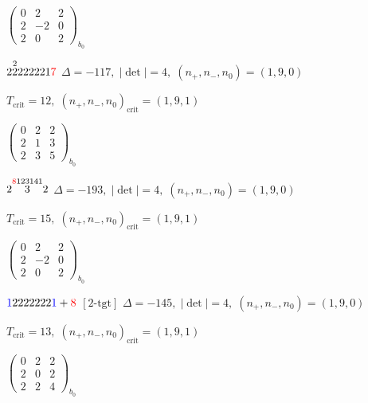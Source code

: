 \documentclass[10pt]{article}
\begin{document}
\hspace{2em}$\left(\begin{smallmatrix}0 & 2 & 2 \\ 2 & -2 & 0 \\ 2 & 0 & 2\end{smallmatrix}\right)_{\!b_0}$

\smallskip

$2\overset{2}{2}222221\textcolor{red}{7}$ \quad $\Delta=-117,\; |\det|=4,\; (n_+,n_-,n_0)=(1,9,0)$

\hspace{1em}$T_{\text{crit}}=12,\; (n_+,n_-,n_0)_{\text{crit}}=(1,9,1)$

\hspace{2em}$\left(\begin{smallmatrix}0 & 2 & 2 \\ 2 & 1 & 3 \\ 2 & 3 & 5\end{smallmatrix}\right)_{\!b_0}$

\smallskip

$2\overset{\textcolor{red}{8}123141}{3}2$ \quad $\Delta=-193,\; |\det|=4,\; (n_+,n_-,n_0)=(1,9,0)$

\hspace{1em}$T_{\text{crit}}=15,\; (n_+,n_-,n_0)_{\text{crit}}=(1,9,1)$

\hspace{2em}$\left(\begin{smallmatrix}0 & 2 & 2 \\ 2 & -2 & 0 \\ 2 & 0 & 2\end{smallmatrix}\right)_{\!b_0}$

\smallskip

$\textcolor{blue}{1}2222222\textcolor{blue}{1}+\textcolor{red}{8}$ $\scriptstyle [2\text{-tgt}]$ \quad $\Delta=-145,\; |\det|=4,\; (n_+,n_-,n_0)=(1,9,0)$

\hspace{1em}$T_{\text{crit}}=13,\; (n_+,n_-,n_0)_{\text{crit}}=(1,9,1)$

\hspace{2em}$\left(\begin{smallmatrix}0 & 2 & 2 \\ 2 & 0 & 2 \\ 2 & 2 & 4\end{smallmatrix}\right)_{\!b_0}$
\end{document}
